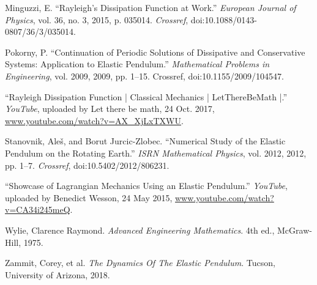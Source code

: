 \begin{thebibliography}{99}
Minguzzi, E. “Rayleigh’s Dissipation Function at Work.” \emph{European Journal of Physics}, vol. 36, no. 3, 2015, p. 035014. \emph{Crossref}, doi:10.1088/0143-0807/36/3/035014.

Pokorny, P. “Continuation of Periodic Solutions of Dissipative and Conservative Systems: Application to Elastic Pendulum.” \emph{Mathematical Problems in Engineering}, vol. 2009, 2009, pp. 1–15. Crossref, doi:10.1155/2009/104547.

“Rayleigh Dissipation Function | Classical Mechanics | LetThereBeMath |.” \emph{YouTube}, uploaded by Let there be math, 24 Oct. 2017, \url{www.youtube.com/watch?v=AX\_XjLxTXWU}.

Stanovnik, Aleš, and Borut Jurcic-Zlobec. “Numerical Study of the Elastic Pendulum on the Rotating Earth.” \emph{ISRN Mathematical Physics}, vol. 2012, 2012, pp. 1–7. \emph{Crossref}, doi:10.5402/2012/806231.

“Showcase of Lagrangian Mechanics Using an Elastic Pendulum.” \emph{YouTube}, uploaded by Benedict Wesson, 24 May 2015, \url{www.youtube.com/watch?v=CA34i245meQ}.

Wylie, Clarence Raymond. \emph{Advanced Engineering Mathematics}. 4th ed., McGraw-Hill, 1975.

Zammit, Corey, et al. \emph{The Dynamics Of The Elastic Pendulum}. Tucson, University of Arizona, 2018.






\end{thebibliography}
